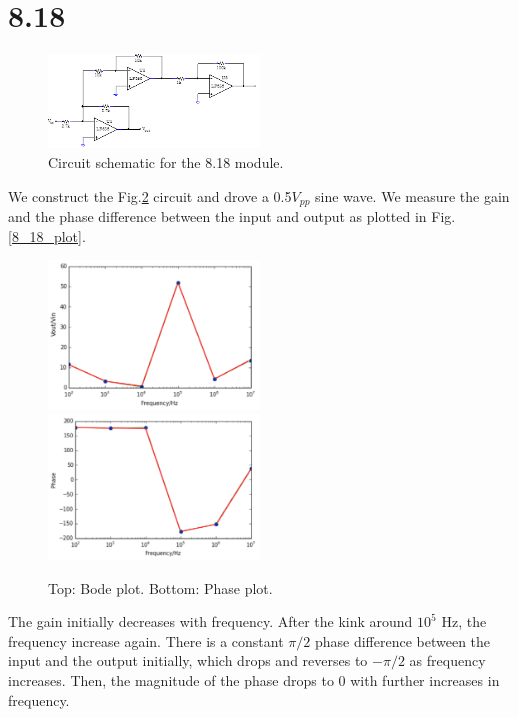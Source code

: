 \documentclass[authoryear, 12pt,5p, times]{elsarticle}
\begin{document}
  \section*{8.18}
   \begin{figure}[h!]
 \centering
  \includegraphics[width=0.5\textwidth]{figure/8_18_schema.png} 
\caption{Circuit schematic for the 8.18 module.}
\label{8_18_schema}
 \end{figure} 
  We construct the Fig.\ref{8_18_schema} circuit and drove a 0.5$V_{pp}$ sine wave. We measure the gain and  the phase difference between the input and output as plotted in Fig.\ref{8_18_plot}. 
   \begin{figure}[h!]
 \centering
  \includegraphics[width=0.5\textwidth]{figure/8_18_plot.png} 
    \includegraphics[width=0.5\textwidth]{figure/8_18_plot2.png} 
\caption{Top: Bode plot. Bottom: Phase plot.}
\label{8_18_schema}
 \end{figure} 
 \par The gain initially decreases with frequency. After the kink around $10^5$ Hz, the frequency increase again. There is a constant $\pi/2$  phase difference between the input and the output initially, which drops and reverses to  $-\pi/2$ as frequency increases. Then, the magnitude of the phase drops to 0 with further increases in frequency.
\end{document}
